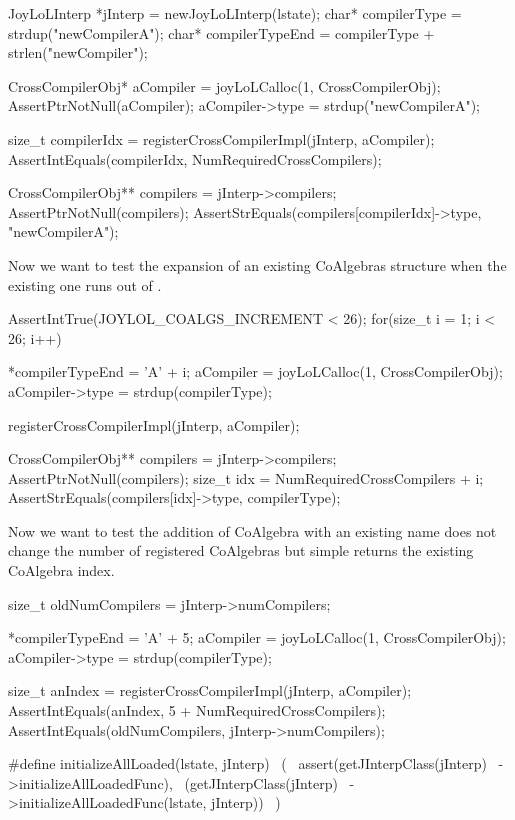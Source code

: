 \startCTest
  JoyLoLInterp *jInterp = newJoyLoLInterp(lstate);
  char*             compilerType       = strdup("newCompilerA");
  char*             compilerTypeEnd    = compilerType + strlen("newCompiler");
  
  CrossCompilerObj* aCompiler = joyLoLCalloc(1, CrossCompilerObj);
  AssertPtrNotNull(aCompiler);
  aCompiler->type               = strdup("newCompilerA");

  size_t compilerIdx = registerCrossCompilerImpl(jInterp, aCompiler);
  AssertIntEquals(compilerIdx, NumRequiredCrossCompilers);

  CrossCompilerObj** compilers = jInterp->compilers;
  AssertPtrNotNull(compilers);
  AssertStrEquals(compilers[compilerIdx]->type, "newCompilerA");
\stopCTest

Now we want to test the expansion of an existing CoAlgebras structure when 
the existing one runs out of .

\startCTest
  AssertIntTrue(JOYLOL_COALGS_INCREMENT < 26);
  for(size_t i = 1; i < 26; i++) {
    *compilerTypeEnd = 'A' + i;
    aCompiler        = joyLoLCalloc(1, CrossCompilerObj);
    aCompiler->type  = strdup(compilerType);

    registerCrossCompilerImpl(jInterp, aCompiler);

    CrossCompilerObj** compilers = jInterp->compilers;
    AssertPtrNotNull(compilers);
    size_t idx = NumRequiredCrossCompilers + i;
    AssertStrEquals(compilers[idx]->type, compilerType);
  }
\stopCTest

Now we want to test the addition of CoAlgebra with an existing name does 
not change the number of registered CoAlgebras but simple returns the 
existing CoAlgebra index. 

\startCTest
  size_t oldNumCompilers = jInterp->numCompilers;

  *compilerTypeEnd       = 'A' + 5;
  aCompiler              = joyLoLCalloc(1, CrossCompilerObj);
  aCompiler->type        = strdup(compilerType);
  
  size_t anIndex = registerCrossCompilerImpl(jInterp, aCompiler);
  AssertIntEquals(anIndex, 5 + NumRequiredCrossCompilers);
  AssertIntEquals(oldNumCompilers, jInterp->numCompilers);
\stopCTest
\stopTestCase
\stopTestSuite

\startTestSuite[initializeAllLoaded]

\startCHeader
#define initializeAllLoaded(lstate, jInterp)      \
  (                                               \
    assert(getJInterpClass(jInterp)               \
      ->initializeAllLoadedFunc),                 \
    (getJInterpClass(jInterp)                     \
      ->initializeAllLoadedFunc(lstate, jInterp)) \
  )
\stopCHeader

